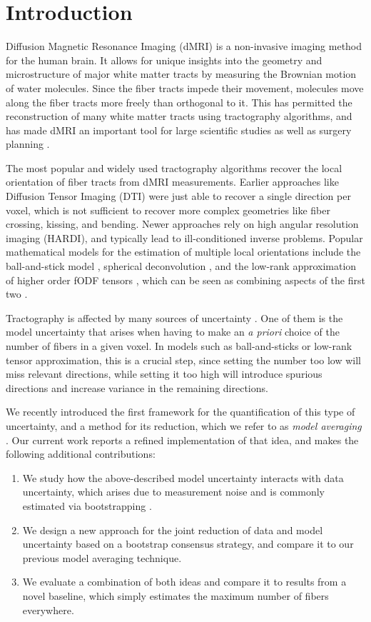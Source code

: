 \section{Introduction}
Diffusion Magnetic Resonance Imaging (dMRI) \cite{LeBihan:1986} is a
non-invasive imaging method for the human brain. It allows for
unique insights into the geometry and microstructure of major white matter tracts by measuring the Brownian motion of water molecules. Since
the fiber tracts impede their movement, molecules move along the fiber tracts
more freely than orthogonal to it. This has permitted the reconstruction of many white matter tracts using tractography algorithms, and has made dMRI an important tool for large
scientific studies \cite{Sotiropoulos:2013, Tobisch:2018Frontiers} as well as surgery planning \cite{Yang:2021}.

The most popular and widely used tractography algorithms recover the local
orientation of fiber tracts from dMRI measurements. Earlier approaches like
Diffusion Tensor Imaging (DTI) \cite{BASSER1994247}
were just able to recover a single direction per voxel, which is not sufficient
to recover more complex geometries like fiber crossing, kissing, and bending.
Newer approaches rely on high angular resolution imaging (HARDI), and typically lead to ill-conditioned inverse problems. Popular mathematical models for the estimation of multiple local orientations include the
ball-and-stick model \cite{BEHRENS2007144}, spherical deconvolution \cite{TOURNIER20071459}, and the low-rank approximation of higher order fODF tensors
\cite{lowrank}, which can be seen as combining aspects of the first two \cite{Schultz:MICCAI10}.

Tractography is affected by many sources of uncertainty \cite{Schultz:SciVisBook2014}. One of them is the model uncertainty that arises when having to make an \emph{a priori} choice of the number of fibers in a given voxel. In models such as ball-and-sticks or low-rank tensor approximation, this is a
crucial step, since setting the number too low will miss relevant directions, while setting it too high will introduce spurious directions and increase variance in the remaining directions.

We recently introduced the first framework for the quantification of this type of uncertainty, and a method for its reduction, which we refer to as \emph{model averaging} \cite{Gruen:2021}. Our current work reports a refined implementation of that idea, and makes the following additional contributions:
\begin{enumerate}
\item We study how the above-described model uncertainty interacts with data uncertainty, which arises due to measurement noise and is commonly estimated via bootstrapping \cite{Chung:2006}.
\item We design a new approach for the joint reduction of data and model uncertainty based on a bootstrap consensus strategy, and compare it to our previous model averaging technique.
\item We evaluate a combination of both ideas and compare it to results from a novel baseline, which simply estimates the maximum number of fibers everywhere.
\end{enumerate}

